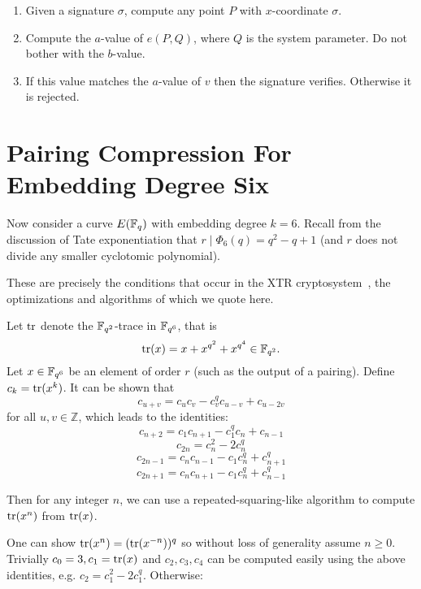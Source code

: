\begin{enumerate}
\item
Given a signature $\sigma$, compute any point $P$ with $x$-coordinate $\sigma$.
\item
Compute the $a$-value of $e(P,Q)$, where $Q$ is the system parameter.
Do not bother with the $b$-value.
\item
If this value matches the $a$-value of $v$ then the signature verifies.
Otherwise it is rejected.
\end{enumerate}

\section {Pairing Compression For Embedding Degree Six}

Now consider a curve $E(\mathbb{F}_q)$ with embedding degree $k=6$.
Recall from the discussion of Tate exponentiation that
$r \mid \Phi_6(q) = q^2 - q + 1$ (and $r$ does not divide any
smaller cyclotomic polynomial).

These are precisely the conditions that occur in the XTR
cryptosystem~\cite{xtr}, the optimizations and algorithms of which we quote
here.

Let $\mathop{\rm tr}$ denote the $\mathbb{F}_{q^2}$-trace in $\mathbb{F}_{q^6}$,
that is
\[ \mathop{\rm tr}(x) = x + x^{q^2} + x^{q^4}  \in \mathbb{F}_{q^2} .\]
Let $x \in \mathbb{F}_{q^6}$ be an element of order $r$ (such as the output of
a pairing).
Define $c_k = \mathop{\rm tr}(x^k)$.
It can be shown that
\[ c_{u+v} = c_u c_v - c_v^q c_{u-v} + c_{u-2v} \]
for all $u,v\in\mathbb{Z}$,
which leads to the identities:
\[ c_{n+2} = c_1 c_{n+1} - c_1^q c_n + c_{n-1} \]
\[ c_{2n} = c_n^2 - 2c_n^q \]
\[ c_{2n-1} = c_n c_{n-1} - c_1 c_n^q + c_{n+1}^q \]
\[ c_{2n+1} = c_n c_{n+1} - c_1 c_n^q + c_{n-1}^q \]

Then for any integer $n$, we can use a repeated-squaring-like algorithm to
compute $\mathop{\rm tr}(x^n)$ from $\mathop{\rm tr}(x)$.

One can show $\mathop{\rm tr} (x^n) = (\mathop{\rm tr}(x^{-n}))^q$ so without loss of generality assume
$n \ge 0$. Trivially $c_0 = 3, c_1 = \mathop{\rm tr}(x)$ and $c_2, c_3, c_4$ can be
computed easily using the above identities, e.g. $c_2 = c_1^2 - 2c_1^q$.
Otherwise:

